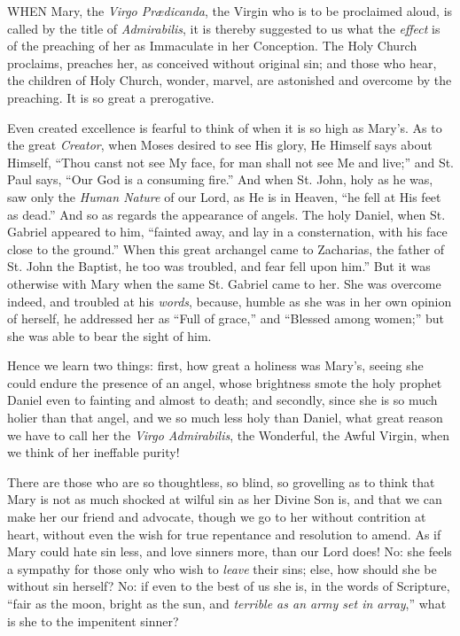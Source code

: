 

WHEN
Mary, the \emph{Virgo Prædicanda}, the Virgin who is to be proclaimed
aloud, is called by the title of \emph{Admirabilis}, it is thereby
suggested to us what the \emph{effect} is of the preaching of her as
Immaculate in her Conception. The Holy Church proclaims, preaches her,
as conceived without original sin; and those who hear, the children of
Holy Church, wonder, marvel, are astonished and overcome by the
preaching. It is so great a prerogative.

Even created excellence is
fearful to think of when it is so high as Mary's. As to the great \emph{Creator},
when Moses desired to see His glory, He Himself says about Himself,
``Thou canst not see My face, for man shall not see Me and live;''
and St. Paul says, ``Our God is a consuming fire.'' And when St. John,
holy as he was, saw only the \emph{Human Nature} of our Lord, as He is
in Heaven, ``he fell at His feet as dead.'' And so as regards the
appearance of angels. The holy Daniel, when St. Gabriel appeared to
him, ``fainted away, and lay in a consternation, with his face close to
the ground.'' When this great archangel came to Zacharias, the father of
St. John the Baptist, he too was troubled, and fear fell upon him.'' But
it was otherwise with Mary when the same St. Gabriel came to her. She
was overcome indeed, and troubled at his \emph{words}, because, humble
as she was in her own opinion of herself, he addressed her as ``Full of
grace,'' and ``Blessed among women;'' but she was able to bear the sight of
him.

Hence we learn two things:
first, how great a holiness was Mary's, seeing she could endure the
presence of an angel, whose brightness smote the holy prophet Daniel
even to fainting and almost to death; and secondly, since she is so much
holier than that angel, and we so much less holy than Daniel, what great
reason we have to call her the \emph{Virgo Admirabilis}, the Wonderful,
the Awful Virgin, when we think of her ineffable purity!

There are those who are so
thoughtless, so blind, so grovelling as to think that Mary is not as
much shocked at wilful sin as her Divine Son is, and that we can make
her our friend and advocate, though we go to her without contrition at
heart, without even the wish for true repentance and resolution to
amend. As if Mary could hate sin less, and love sinners more, than our
Lord does! No: she feels a sympathy for those only who wish to \emph{leave}
their sins; else, how should she be without sin herself? No: if even to
the best of us she is, in the words of Scripture, ``fair as the moon,
bright as the sun, and \emph{terrible as an army set in array},'' what is
she to the impenitent sinner?

